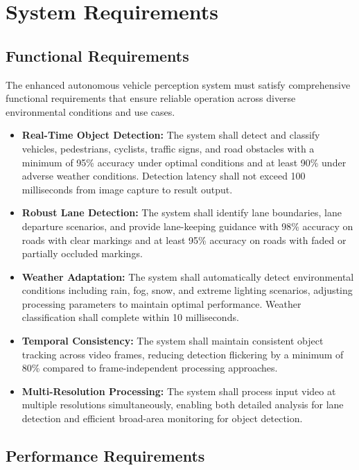 \chapter{System Requirements}

\section{Functional Requirements}

The enhanced autonomous vehicle perception system must satisfy comprehensive functional requirements that ensure reliable operation across diverse environmental conditions and use cases.

\begin{itemize}
    \item \textbf{Real-Time Object Detection:} The system shall detect and classify vehicles, pedestrians, cyclists, traffic signs, and road obstacles with a minimum of 95\% accuracy under optimal conditions and at least 90\% under adverse weather conditions. Detection latency shall not exceed 100 milliseconds from image capture to result output.
    
    \item \textbf{Robust Lane Detection:} The system shall identify lane boundaries, lane departure scenarios, and provide lane-keeping guidance with 98\% accuracy on roads with clear markings and at least 95\% accuracy on roads with faded or partially occluded markings.
    
    \item \textbf{Weather Adaptation:} The system shall automatically detect environmental conditions including rain, fog, snow, and extreme lighting scenarios, adjusting processing parameters to maintain optimal performance. Weather classification shall complete within 10 milliseconds.
    
    \item \textbf{Temporal Consistency:} The system shall maintain consistent object tracking across video frames, reducing detection flickering by a minimum of 80\% compared to frame-independent processing approaches.
    
    \item \textbf{Multi-Resolution Processing:} The system shall process input video at multiple resolutions simultaneously, enabling both detailed analysis for lane detection and efficient broad-area monitoring for object detection.
\end{itemize}

\section{Performance Requirements}

